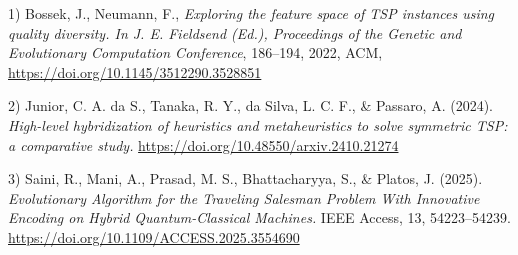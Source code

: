 \documentclass{scrartcl}
\begin{document}




  1) Bossek, J., Neumann, F.,
    \emph{Exploring the feature space of TSP instances using quality diversity. In J. E. Fieldsend (Ed.), Proceedings of the Genetic and Evolutionary Computation Conference},
    186--194,
    2022,
    ACM,
    \url{https://doi.org/10.1145/3512290.3528851}

  2)
   Junior, C. A. da S., Tanaka, R. Y., da Silva, L. C. F., & Passaro, A. (2024). 
   \emph{High-level hybridization of heuristics and metaheuristics to solve symmetric TSP: a comparative study.} 
   \url{https://doi.org/10.48550/arxiv.2410.21274}  

  3)
  Saini, R., Mani, A., Prasad, M. S., Bhattacharyya, S., & Platos, J. (2025). \emph{Evolutionary Algorithm for the Traveling Salesman Problem With Innovative Encoding on Hybrid Quantum-Classical Machines.} IEEE Access, 13, 54223–54239. \url{https://doi.org/10.1109/ACCESS.2025.3554690}
\end{document}
